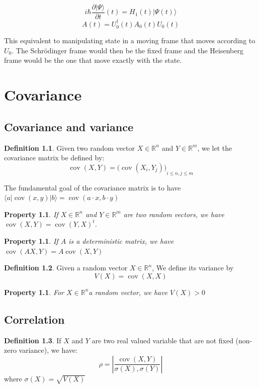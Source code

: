 \documentclass[10pt,a4paper]{report}
\theoremstyle{plain}
\newtheorem{prop}[thm]{Property}
\theoremstyle{definition}
\newtheorem{defn}{Definition}[chapter]
\theoremstyle{remark}
\newcommand{\R}{\ensuremath{\mathbb{R}}}
\newcommand{\ket}[1]{|#1\rangle}
\newcommand{\bra}[1]{\langle#1|}
\renewcommand{\leq}{\leqslant}
\DeclareMathOperator{\cov}{cov}
\begin{document}
\[i\hbar \frac{\partial \ket \Psi}{\partial t} (t) = H_1(t) \ket {\Psi(t)} \]
\[A(t) = U_0^\dagger(t)A_0(t)U_0(t)\]

This equivalent to manipulating state in a moving frame that moves according to
$U_0$. The Schrödinger frame would then be the fixed frame and the Heisenberg frame
would be the one that move exactly with the state.

\chapter{Covariance}\label{app:cov}

\section{Covariance and variance}

\begin{defn}
  Given two random vector $X \in \R^n$ and $Y \in \R^m$, we let the covariance
  matrix be defined by:
  \[\cov(X,Y) = {\big(\cov(X_i,Y_j)\big)}_{i \leq n, j \leq m}\]
\end{defn}

The fundamental goal of the covariance matrix is to have $\bra a \cov(x,y) \ket
b = \cov(a \cdot x, b \cdot y)$
\begin{prop} If $X \in \R^n$ and $Y \in \R^m$ are two random vectors, we have $\cov(X,Y) = {\cov(Y,X)}^t$.
\end{prop}
\begin{prop} If $A$ is a deterministic matrix, we have $ \cov(A X, Y) = A \cov(X,Y)$
\end{prop}

\begin{defn}
  Given a random vector $X \in \R^n$, We define its variance by
  \[V(X) = \cov(X,X)\]
\end{defn}

\begin{prop} For $X \in \R^n$a random vector, we have $V(X) > 0$
\end{prop}

\section{Correlation}\label{sec:correl}

\begin{defn}
  If $X$ and $Y$ are two real valued variable that are not fixed (non-zero
  variance), we have:
  \[\rho = \left|\frac {\cov(X,Y)}{\sigma(X),\sigma(Y)}\right|\]
  where $\sigma(X) = \sqrt{V(X)}$
\end{defn}
\end{document}
